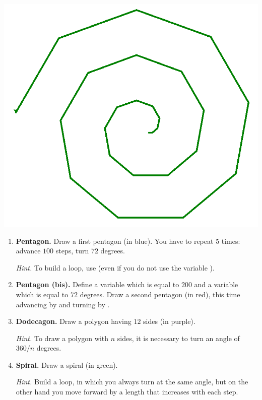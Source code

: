 \documentclass[11pt,class=report,crop=false]{standalone}
\begin{document}
\begin{activite}[Figures]
\begin{center}
\includegraphics[scale=\myscale,scale=0.2]{screen-turtle-2d}
\end{center}

\begin{enumerate}
  \item \textbf{Pentagon.} Draw a first pentagon (in blue). You have to repeat $5$ times: advance $100$ steps, turn $72$ degrees.
  
  \emph{Hint.} To build a loop, use  
   (even if you do not use the variable ).
  
  \item \textbf{Pentagon (bis).} Define a variable  which is equal to $200$ and a variable  which is equal to $72$ degrees. Draw a second pentagon (in red), this time advancing by  and turning by .
  
  \item \textbf{Dodecagon.} Draw a polygon having $12$ sides (in purple). 
  
  \emph{Hint.} To draw a polygon with $n$ sides, it is necessary to turn an angle of $360/n$ degrees.
  
  \item \textbf{Spiral.} Draw a spiral (in green).
  
  \emph{Hint.} Build a loop, in which you always turn at the same angle, but on the other hand you move forward by a length that increases with each step.
  
\end{enumerate}
  
\end{activite}
\end{document}
